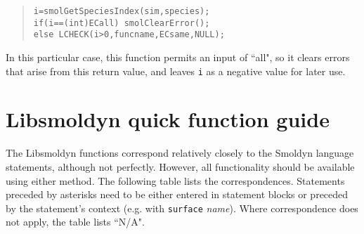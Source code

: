 \documentclass {book}
\begin{document}
\begin{quote}
\begin{lstlisting}
i=smolGetSpeciesIndex(sim,species);
if(i==(int)ECall) smolClearError();
else LCHECK(i>0,funcname,ECsame,NULL);
\end{lstlisting}
\end{quote}

In this particular case, this function permits an input of ``all", so it clears errors that arise from this return value, and leaves \texttt{i} as a negative value for later use.


\chapter{Libsmoldyn quick function guide}
The Libsmoldyn functions correspond relatively closely to the Smoldyn language statements, although not perfectly.  However, all functionality should be available using either method.  The following table lists the correspondences.  Statements preceded by asterisks need to be either entered in statement blocks or preceded by the statement's context (e.g. with \texttt{surface} \emph{name}).  Where correspondence does not apply, the table lists ``N/A".
\end{document}
